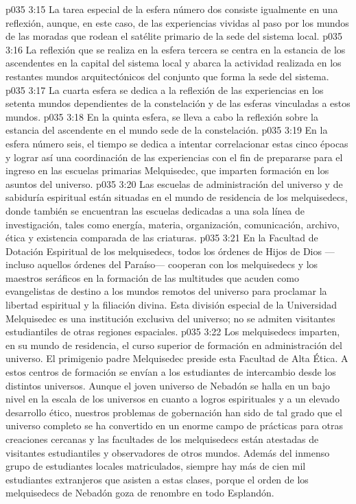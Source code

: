 \vs p035 3:15 La tarea especial de la esfera número dos consiste igualmente en una reflexión, aunque, en este caso, de las experiencias vividas al paso por los mundos de las moradas que rodean el satélite primario de la sede del sistema local.
\vs p035 3:16 La reflexión que se realiza en la esfera tercera se centra en la estancia de los ascendentes en la capital del sistema local y abarca la actividad realizada en los restantes mundos arquitectónicos del conjunto que forma la sede del sistema.
\vs p035 3:17 La cuarta esfera se dedica a la reflexión de las experiencias en los setenta mundos dependientes de la constelación y de las esferas vinculadas a estos mundos.
\vs p035 3:18 En la quinta esfera, se lleva a cabo la reflexión sobre la estancia del ascendente en el mundo sede de la constelación.
\vs p035 3:19 En la esfera número seis, el tiempo se dedica a intentar correlacionar estas cinco épocas y lograr así una coordinación de las experiencias con el fin de prepararse para el ingreso en las escuelas primarias Melquisedec, que imparten formación en los asuntos del universo.
\vs p035 3:20 \pc Las escuelas de administración del universo y de sabiduría espiritual están situadas en el mundo de residencia de los melquisedecs, donde también se encuentran las escuelas dedicadas a una sola línea de investigación, tales como energía, materia, organización, comunicación, archivo, ética y existencia comparada de las criaturas.
\vs p035 3:21 En la Facultad de Dotación Espiritual de los melquisedecs, todos los órdenes de Hijos de Dios ---incluso aquellos órdenes del Paraíso--- cooperan con los melquisedecs y los maestros seráficos en la formación de las multitudes que acuden como evangelistas de destino a los mundos remotos del universo para proclamar la libertad espiritual y la filiación divina. Esta división especial de la Universidad Melquisedec es una institución exclusiva del universo; no se admiten visitantes estudiantiles de otras regiones espaciales.
\vs p035 3:22 Los melquisedecs imparten, en su mundo de residencia, el curso superior de formación en administración del universo. El primigenio padre Melquisedec preside esta Facultad de Alta Ética. A estos centros de formación se envían a los estudiantes de intercambio desde los distintos universos. Aunque el joven universo de Nebadón se halla en un bajo nivel en la escala de los universos en cuanto a logros espirituales y a un elevado desarrollo ético, nuestros problemas de gobernación han sido de tal grado que el universo completo se ha convertido en un enorme campo de prácticas para otras creaciones cercanas y las facultades de los melquisedecs están atestadas de visitantes estudiantiles y observadores de otros mundos. Además del inmenso grupo de estudiantes locales matriculados, siempre hay más de cien mil estudiantes extranjeros que asisten a estas clases, porque el orden de los melquisedecs de Nebadón goza de renombre en todo Esplandón.
